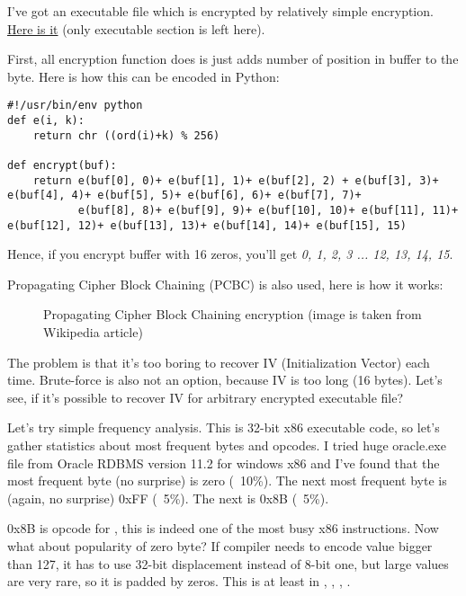 
I've got an executable file which is encrypted by relatively simple encryption.
\href{https://github.com/DennisYurichev/RE-for-beginners/blob/master/examples/simple_exec_crypto/files/cipher.bin}{Here is it} (only executable section is left here).

First, all encryption function does is just adds number of position in buffer to the byte.
Here is how this can be encoded in Python:

\begin{lstlisting}[caption=Python script,style=custompy]
#!/usr/bin/env python
def e(i, k):
    return chr ((ord(i)+k) % 256)

def encrypt(buf):
    return e(buf[0], 0)+ e(buf[1], 1)+ e(buf[2], 2) + e(buf[3], 3)+ e(buf[4], 4)+ e(buf[5], 5)+ e(buf[6], 6)+ e(buf[7], 7)+
           e(buf[8], 8)+ e(buf[9], 9)+ e(buf[10], 10)+ e(buf[11], 11)+ e(buf[12], 12)+ e(buf[13], 13)+ e(buf[14], 14)+ e(buf[15], 15)
\end{lstlisting}

Hence, if you encrypt buffer with 16 zeros, you'll get \emph{0, 1, 2, 3 ... 12, 13, 14, 15}.

Propagating Cipher Block Chaining (PCBC) is also used, here is how it works:

\begin{figure}[H]
\centering
{}
\caption{Propagating Cipher Block Chaining encryption (image is taken from Wikipedia article)}
\end{figure}

The problem is that it's too boring to recover IV (Initialization Vector) each time.
Brute-force is also not an option, because IV is too long (16 bytes).
Let's see, if it's possible to recover IV for arbitrary encrypted executable file?

Let's try simple frequency analysis.
This is 32-bit x86 executable code, so let's gather statistics about most frequent bytes and opcodes.
I tried huge oracle.exe file from Oracle RDBMS version 11.2 for windows x86 and I've found that the most frequent byte (no surprise) is zero (~10\%).
The next most frequent byte is (again, no surprise) 0xFF (~5\%).
The next is 0x8B (~5\%).

0x8B is opcode for , this is indeed one of the most busy x86 instructions.
Now what about popularity of zero byte?
If compiler needs to encode value bigger than 127, it has to use 32-bit displacement instead of 8-bit one, but large values are very rare,
so it is padded by zeros.
This is at least in , , , .

